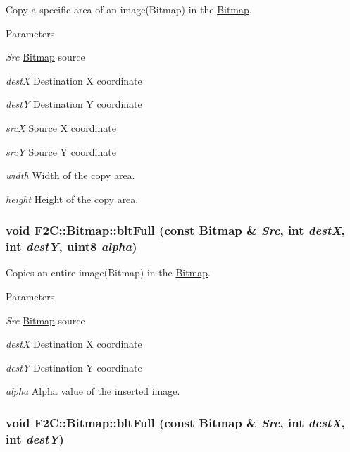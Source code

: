 Copy a specific area of an image(Bitmap) in the \hyperlink{class_f2_c_1_1_bitmap}{Bitmap}. 
\begin{DoxyParams}{Parameters}
\item[{\em Src}]\hyperlink{class_f2_c_1_1_bitmap}{Bitmap} source \item[{\em destX}]Destination X coordinate \item[{\em destY}]Destination Y coordinate \item[{\em srcX}]Source X coordinate \item[{\em srcY}]Source Y coordinate \item[{\em width}]Width of the copy area. \item[{\em height}]Height of the copy area. \end{DoxyParams}
\hypertarget{class_f2_c_1_1_bitmap_aa3cd20c474704adcaf89bcd48d0aa00b}{
\subsubsection[{bltFull}]{\setlength{\rightskip}{0pt plus 5cm}void F2C::Bitmap::bltFull (const {\bf Bitmap} \& {\em Src}, \/  int {\em destX}, \/  int {\em destY}, \/  {\bf uint8} {\em alpha})}}
\label{class_f2_c_1_1_bitmap_aa3cd20c474704adcaf89bcd48d0aa00b}


Copies an entire image(Bitmap) in the \hyperlink{class_f2_c_1_1_bitmap}{Bitmap}. 
\begin{DoxyParams}{Parameters}
\item[{\em Src}]\hyperlink{class_f2_c_1_1_bitmap}{Bitmap} source \item[{\em destX}]Destination X coordinate \item[{\em destY}]Destination Y coordinate \item[{\em alpha}]Alpha value of the inserted image. \end{DoxyParams}
\hypertarget{class_f2_c_1_1_bitmap_a331c8fd3b1991c248adc464b8082f091}{
\subsubsection[{bltFull}]{\setlength{\rightskip}{0pt plus 5cm}void F2C::Bitmap::bltFull (const {\bf Bitmap} \& {\em Src}, \/  int {\em destX}, \/  int {\em destY})}}
\label{class_f2_c_1_1_bitmap_a331c8fd3b1991c248adc464b8082f091}


